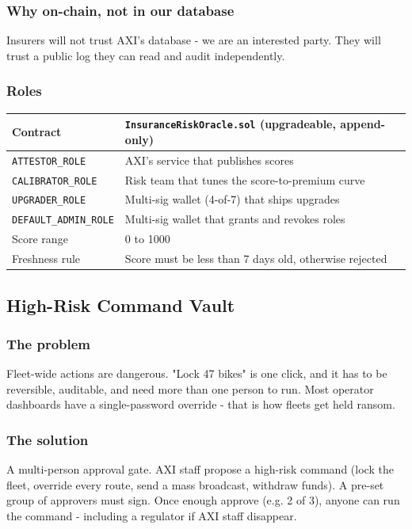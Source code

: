 \documentclass[11pt,a4paper]{article}
\begin{document}
\subsubsection{Why on-chain, not in our database}
Insurers will not trust AXI's database - we are an interested party. They will trust a public log they can read and audit independently.

\subsubsection{Roles}

\begin{center}
\begin{tabular}{p{3.8cm} p{11.5cm}}
\toprule
{\bfseries\color{axiprimary}Contract} & \texttt{InsuranceRiskOracle.sol} (upgradeable, append-only) \\
\midrule
\texttt{ATTESTOR\_ROLE} & AXI's service that publishes scores \\
\texttt{CALIBRATOR\_ROLE} & Risk team that tunes the score-to-premium curve \\
\texttt{UPGRADER\_ROLE} & Multi-sig wallet (4-of-7) that ships upgrades \\
\texttt{DEFAULT\_ADMIN\_ROLE} & Multi-sig wallet that grants and revokes roles \\
Score range & 0 to 1000 \\
Freshness rule & Score must be less than 7 days old, otherwise rejected \\
\bottomrule
\end{tabular}
\end{center}

\newpage
\subsection{High-Risk Command Vault}

\subsubsection{The problem}
Fleet-wide actions are dangerous. "Lock 47 bikes" is one click, and it has to be reversible, auditable, and need more than one person to run. Most operator dashboards have a single-password override - that is how fleets get held ransom.

\subsubsection{The solution}
A multi-person approval gate. AXI staff propose a high-risk command (lock the fleet, override every route, send a mass broadcast, withdraw funds). A pre-set group of approvers must sign. Once enough approve (e.g. 2 of 3), anyone can run the command - including a regulator if AXI staff disappear.
\end{document}
